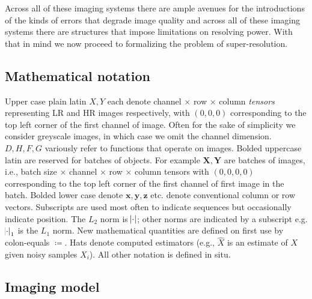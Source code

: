 Across all of these imaging systems there are ample avenues for the introductions of the kinds of errors that degrade image quality and across all of these imaging systems there are structures that impose limitations on resolving power.
%
With that in mind we now proceed to formalizing the problem of super-resolution.

\subsection{Mathematical notation}\label{subsec:notation}
Upper case plain latin \(X, Y\) each denote channel \(\times\) row \(\times\) column \textit{tensors} representing LR and HR images respectively, with \((0, 0,0)\) corresponding to the top left corner of the first channel of image.
%
Often for the sake of simplicity we consider greyscale images, in which case we omit the channel dimension.
%
\(D, H, F, G\) variously refer to functions that operate on images.
%
Bolded uppercase latin are reserved for batches of objects.
%
For example \(\bm{X}, \bm{Y}\) are batches of images, i.e., batch size \(\times\) channel \(\times\) row \(\times\) column tensors with \((0, 0, 0,0)\) corresponding to the top left corner of the first channel of first image in the batch.
%
Bolded lower case denote \(\bm{x}, \bm{y}, \bm{z}\) etc. denote conventional column or row vectors.
%
Subscripts are used most often to indicate sequences but occasionally indicate position.
%
The \(L_2\) norm is \(\abs{\cdot}\); other norms are indicated by a subscript e.g. \(\abs{\cdot}_1\) is the \(L_1\) norm.
%
New mathematical quantities are defined on first use by colon-equals \(\coloneqq\).
%
Hats denote computed estimators (e.g., \(\hat{X}\) is an estimate of \(X\) given noisy samples \(X_i\)).
%
All other notation is defined in situ.

\subsection{Imaging model}\label{subsec:imaging-model}


